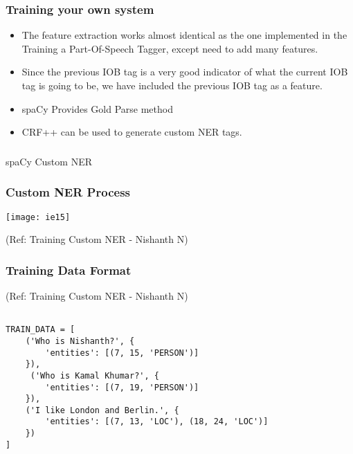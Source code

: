 \begin{frame}[fragile]\frametitle{Training your own system}
  \begin{itemize}
  \item The feature extraction works almost identical as the one implemented in the Training a Part-Of-Speech Tagger, except need to add many features.
  \item Since the previous IOB tag is a very good indicator of what the current IOB tag is going to be, we have included the previous IOB tag as a feature.
  \item spaCy Provides Gold Parse method
  \item CRF++ can be used to generate custom NER tags.
  \end{itemize}
\end{frame}

\begin{frame}[fragile]\frametitle{}

\begin{center}
{\Large spaCy Custom NER}
\end{center}
\end{frame}

\begin{frame}[fragile]\frametitle{Custom NER Process}


\begin{center}
\texttt{[image: ie15]}
\end{center}

{\tiny (Ref: Training Custom NER - Nishanth N)}

\end{frame}

\begin{frame}[fragile]\frametitle{Training Data Format}

{\tiny (Ref: Training Custom NER - Nishanth N)}


\begin{lstlisting}

TRAIN_DATA = [
    ('Who is Nishanth?', {
        'entities': [(7, 15, 'PERSON')]
    }),
     ('Who is Kamal Khumar?', {
        'entities': [(7, 19, 'PERSON')]
    }),
    ('I like London and Berlin.', {
        'entities': [(7, 13, 'LOC'), (18, 24, 'LOC')]
    })
]
\end{lstlisting}


\end{frame}

